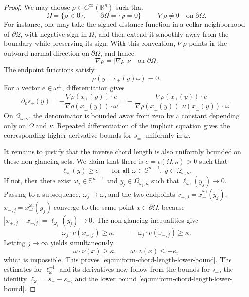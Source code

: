 \documentclass[11pt]{article}
\numberwithin{equation}{section}
\newcommand{\Sn}{\mathbb S^{n-1}}
\newcommand{\bd}{\partial}
\newcommand{\Om}{\Omega}
\begin{document}
\begin{proof}
We may choose \(\rho\in C^\infty(\mathbb R^n)\) such that
\[
\Omega=\{\rho<0\},
\qquad
\partial\Omega=\{\rho=0\},
\qquad
\nabla\rho\ne0\quad\text{on }\partial\Omega .
\]
For instance, one may take the signed distance function in a collar neighborhood of \(\partial\Omega\), with negative sign in \(\Omega\), and then extend it smoothly away from the boundary while preserving its sign. With this convention, \(\nabla\rho\) points in the outward normal direction on \(\partial\Omega\), and hence
\[
\nabla\rho=|\nabla\rho|\,\nu
\quad\text{on }\partial\Omega .
\]  
The endpoint functions satisfy
\[
    \rho(y+s_\pm(y)\omega)=0.
\]
For a vector \(e\in\omega^\perp\), differentiation gives
\begin{equation}\label{eq:s-pm-first-derivative}
    \partial_e s_\pm(y)
    =
    -
    \frac{\nabla\rho(x_\pm(y))\cdot e}
         {\nabla\rho(x_\pm(y))\cdot\omega}
    =
    -
    \frac{\nabla\rho(x_\pm(y))\cdot e}
         {|\nabla\rho(x_\pm(y))|\,\nu(x_\pm(y))\cdot\omega} .
\end{equation}
On \(\Omega_{\omega,\kappa}\), the denominator is bounded away from zero by a constant depending only on \(\Omega\) and \(\kappa\).  Repeated differentiation of the implicit equation gives the corresponding higher derivative bounds for \(s_\pm\), uniformly in \(\omega\).

It remains to justify that the inverse chord length is also uniformly bounded on these non-glancing sets.  We claim that there is \(c=c(\Omega,\kappa)>0\) such that
\begin{equation}\label{eq:uniform-chord-length-lower-bound}
    \ell_\omega(y)\ge c
    \qquad
    \text{for all }\omega\in\Sn,\ y\in\Omega_{\omega,\kappa}.
\end{equation}
If not, then there exist \(\omega_j\in\Sn\) and \(y_j\in\Omega_{\omega_j,\kappa}\) such that \(\ell_{\omega_j}(y_j)\to0\).  Passing to a subsequence, \(\omega_j\to\omega\), and the two endpoints \(x_{+,j}=x_+^{\omega_j}(y_j)\), \(x_{-,j}=x_-^{\omega_j}(y_j)\) converge to the same point \(x\in\bd\Om\), because \(|x_{+,j}-x_{-,j}|=\ell_{\omega_j}(y_j)\to0\).  The non-glancing inequalities give
\[
    \omega_j\cdot\nu(x_{+,j})\ge\kappa,
    \qquad
    -\omega_j\cdot\nu(x_{-,j})\ge\kappa .
\]
Letting \(j\to\infty\) yields simultaneously
\[
    \omega\cdot\nu(x)\ge\kappa,
    \qquad
    \omega\cdot\nu(x)\le-\kappa,
\]
which is impossible.  This proves \eqref{eq:uniform-chord-length-lower-bound}.  The estimates for \(\ell_\omega^{-1}\) and its derivatives now follow from the bounds for \(s_\pm\), the identity \(\ell_\omega=s_+-s_-\), and the lower bound \eqref{eq:uniform-chord-length-lower-bound}.


\end{proof}
\end{document}
